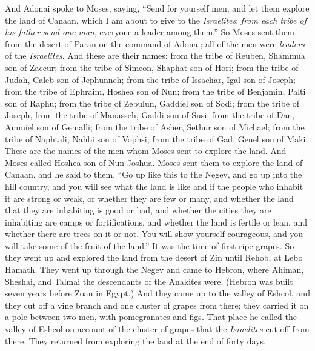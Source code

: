 \begin{biblechapter} %
 And Adonai spoke to Moses, saying,
\verse “Send for yourself men, and let them explore the land of Canaan, which I am about to give to the \textit{Israelites}; \textit{from each tribe of his father send one man}, everyone a leader among them.”
\verse So Moses sent them from the desert of Paran on the command of Adonai; all of the men were \textit{leaders} of the \textit{Israelites}.
\verse And these are their names: from the tribe of Reuben, Shammua son of Zaccur;
\verse from the tribe of Simeon, Shaphat son of Hori;
\verse from the tribe of Judah, Caleb son of Jephunneh;
\verse from the tribe of Issachar, Igal son of Joseph;
\verse from the tribe of Ephraim, Hoshea son of Nun;
\verse from the tribe of Benjamin, Palti son of Raphu;
\verse from the tribe of Zebulun, Gaddiel son of Sodi;
\verse from the tribe of Joseph, from the tribe of Manasseh, Gaddi son of Susi;
\verse from the tribe of Dan, Ammiel son of Gemalli;
\verse from the tribe of Asher, Sethur son of Michael;
\verse from the tribe of Naphtali, Nahbi son of Vophsi;
\verse from the tribe of Gad, Geuel son of Maki.
\verse These are the names of the men whom Moses sent to explore the land. And Moses called Hoshea son of Nun Joshua.
\verse Moses sent them to explore the land of Canaan, and he said to them, “Go up like this to the Negev, and go up into the hill country,
\verse and you will see what the land is like and if the people who inhabit it are strong or weak, or whether they are few or many,
\verse and whether the land that they are inhabiting is good or bad, and whether the cities they are inhabiting are camps or fortifications,
\verse and whether the land is fertile or lean, and whether there are trees on it or not. You will show yourself courageous, and you will take some of the fruit of the land.” It was the time of first ripe grapes.
\verse So they went up and explored the land from the desert of Zin until Rehob, at Lebo Hamath.
\verse They went up through the Negev and came to Hebron, where Ahiman, Sheshai, and Talmai the descendants of the Anakites were. (Hebron was built seven years before Zoan in Egypt.)
\verse And they came up to the valley of Eshcol, and they cut off a vine branch and one cluster of grapes from there; they carried it on a pole between two men, with pomegranates and figs.
\verse That place he called the valley of Eshcol on account of the cluster of grapes that the \textit{Israelites} cut off from there.
 They returned from exploring the land at the end of forty days.

\end{biblechapter}
